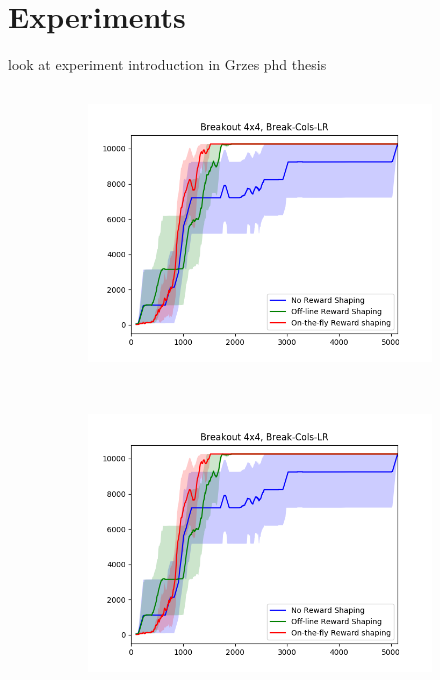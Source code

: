 \chapter{Experiments}
look at experiment introduction in Grzes phd thesis
\section{\Breakout}



\begin{figure}[h]
	 \centering
	 \begin{subfigure}[b]{0.3\textwidth}
	 	\includegraphics[width=\textwidth]{images/b44-cols-comparison.png}
	 \end{subfigure}
	 ~ %
	 \begin{subfigure}[b]{0.3\textwidth}
	 	\includegraphics[width=\textwidth]{images/b44-cols-comparison.png}

\end{subfigure}
\end{figure}
